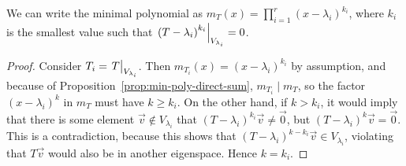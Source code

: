 \begin{lemma}
    We can write the minimal polynomial as
    \(m_T(x) = \prod_{i=1}^r {(x-\lambda_i)}^{k_i}\),
    where \(k_i\) is the smallest value such that
    \(\eval{{(T-\lambda_i)}^{k_i}}_{V_{\lambda_i}} = 0\).
\end{lemma}
\begin{proof}
    Consider \(T_i = \eval{T}_{V_{\lambda_i}}\).
    Then \(m_{T_i}(x) = {(x-\lambda_i)}^{k_i}\) by assumption,
    and because of Proposition~\ref{prop:min-poly-direct-sum}, \(m_{T_i} \mid m_T\),
    so the factor \({(x-\lambda_i)}^k\) in \(m_T\) must have \(k \geq k_i\).
    On the other hand, if \(k > k_i\),
    it would imply that there is some element \(\vec{v} \notin V_{\lambda_i}\)
    that \({(T-\lambda_i)}^{k_i}\vec{v} \neq \vec{0}\),
    but \({(T-\lambda_i)}^k\vec{v} = \vec{0}\).
    This is a contradiction, because this shows that \({(T-\lambda_i)}^{k-k_i}\vec{v} \in V_{\lambda_i}\),
    violating that \(T\vec{v}\) would also be in another eigenspace.
    Hence \(k = k_i\).
\end{proof}


